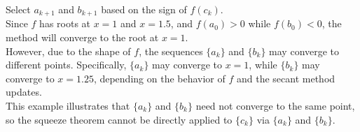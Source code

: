\documentclass{article}
\begin{document}
    Select \( a_{k+1} \) and \( b_{k+1} \) based on the sign of \( f(c_k) \).
    \\
    Since \( f \) has roots at \( x = 1 \) and \( x = 1.5 \), and \( f(a_0) > 0 \) while \( f(b_0) < 0 \), the method will converge to the root at \( x = 1 \).
    \\
    However, due to the shape of \( f \), the sequences \( \{ a_k \} \) and \( \{ b_k \} \) may converge to different points. Specifically, \( \{ a_k \} \) may converge to \( x = 1 \), while \( \{ b_k \} \) may converge to \( x = 1.25 \), depending on the behavior of \( f \) and the secant method updates.
    \\
    This example illustrates that \( \{ a_k \} \) and \( \{ b_k \} \) need not converge to the same point, so the squeeze theorem cannot be directly applied to \( \{ c_k \} \) via \( \{ a_k \} \) and \( \{ b_k \} \).
\end{document}
